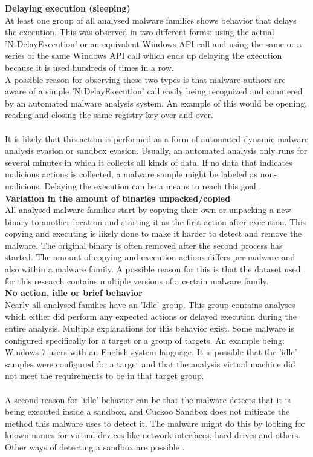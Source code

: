 \documentclass[conference]{IEEEtran}
\begin{document}
\textbf{Delaying execution (sleeping)}\\
At least one group of all analysed malware families shows behavior that delays the execution. This was observed in two different forms: using the actual 'NtDelayExecution' or an equivalent Windows API call and using the same or a series of the same Windows API call which ends up delaying the execution because it is used hundreds of times in a row. \\A possible reason for observing these two types is that malware authors are aware of a simple 'NtDelayExecution' call easily being recognized and countered by an automated malware analysis system. An example of this would be opening, reading and closing the same registry key over and over. \\\\It is likely that this action is performed as a form of automated dynamic malware analysis evasion or sandbox evasion. Usually, an automated analysis only runs for several minutes in which it collects all kinds of data. If no data that indicates malicious actions is collected, a malware sample might be labeled as non-malicious. Delaying the execution can be a means to reach this goal \cite{keragala-evasion}.\\

\textbf{Variation in the amount of binaries unpacked/copied}\\
All analysed malware families start by copying their own or unpacking a new binary to another location and starting it as the first action after execution. This copying and executing is likely done to make it harder to detect and remove the malware. The original binary is often removed after the second process has started. The amount of copying and execution actions differs per malware and also within a malware family. A possible reason for this is that the dataset used for this research contains multiple versions of a certain malware family.\\

\textbf{No action, idle or brief behavior}\\
Nearly all analysed families have an 'Idle' group. This group contains analyses which either did perform any expected actions or delayed execution during the entire analysis. Multiple explanations for this behavior exist. Some malware is configured specifically for a target or a group of targets. An example being: Windows 7 users with an English system language. It is possible that the 'idle' samples were configured for a target and that the analysis virtual machine did not meet the requirements to be in that target group.\\\\
A second reason for 'idle' behavior can be that the malware detects that it is being executed inside a sandbox, and Cuckoo Sandbox does not mitigate the method this malware uses to detect it. The malware might do this by looking for known names for virtual devices like network interfaces, hard drives and others. Other ways of detecting a sandbox are possible \cite{keragala-evasion}.\\
\end{document}
